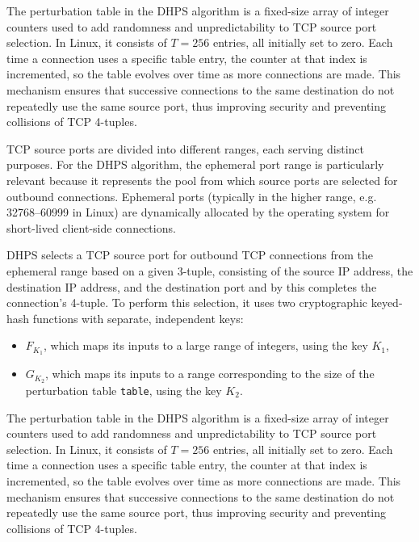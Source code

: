 \documentclass[twocolumn]{report}
\begin{document}
{	The \alert{perturbation table} in the DHPS algorithm is a fixed-size array of integer counters used to add randomness and unpredictability to TCP source port selection. In Linux, it consists of $T = 256$ entries, all initially set to zero. Each time a connection uses a specific table entry, the counter at that index is incremented, so the table evolves over time as more connections are made. This mechanism ensures that successive connections to the same destination do not repeatedly use the same source port, thus improving security and preventing collisions of TCP 4-tuples.
}{
	TCP source ports are divided into different ranges, each serving distinct purposes. For the DHPS algorithm, the ephemeral port range is particularly relevant because it represents the pool from which source ports are selected for outbound connections. \alert{Ephemeral ports} (typically in the higher range, e.g. 32768–60999 in Linux) are dynamically allocated by the operating system for short-lived client-side connections.

	DHPS selects a TCP \alert{source port} for outbound TCP connections from the ephemeral range based on a given \alert{3-tuple}, consisting of the \alert{source IP} address, the \alert{destination IP} address, and the \alert{destination port} and by this completes the connection’s \alert{4-tuple}. To perform this selection, it uses two \alert{cryptographic keyed-hash functions} with separate, independent keys:
	\begin{itemize}
		\item \( F_{K_1} \), which maps its inputs to a large range of integers, using the key \( K_1 \),
		\item \( G_{K_2} \), which maps its inputs to a range corresponding to the size of the \alert{perturbation table} \texttt{table}, using the key \( K_2 \).
	\end{itemize}
	The \alert{perturbation table} in the DHPS algorithm is a fixed-size array of integer counters used to add randomness and unpredictability to TCP source port selection. In Linux, it consists of $T = 256$ entries, all initially set to zero. Each time a connection uses a specific table entry, the counter at that index is incremented, so the table evolves over time as more connections are made. This mechanism ensures that successive connections to the same destination do not repeatedly use the same source port, thus improving security and preventing collisions of TCP 4-tuples.
}
\end{document}
